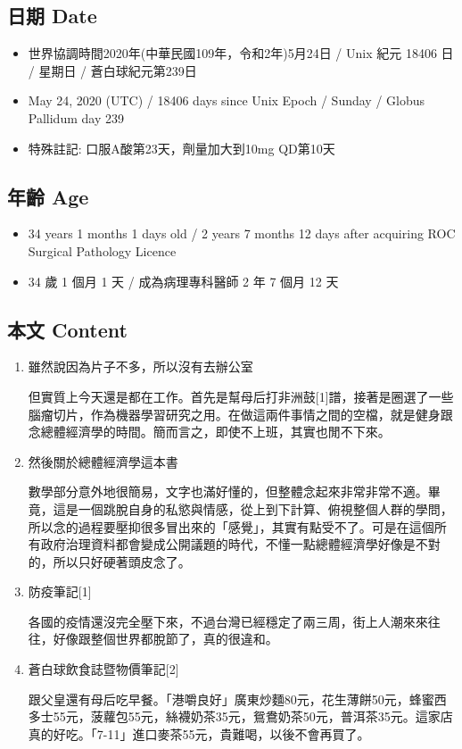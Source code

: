 \documentclass[a5paper, 12pt
]{book}
\providecommand{\tightlist}{%
  \setlength{\itemsep}{0pt}\setlength{\parskip}{0pt}}
\begin{document}
\hypertarget{ux65e5ux671f-date-84}{%
\subsection{日期 Date}\label{ux65e5ux671f-date-84}}

\begin{itemize}
\tightlist
\item
  世界協調時間2020年(中華民國109年，令和2年)5月24日 / Unix 紀元 18406 日
  / 星期日 / 蒼白球紀元第239日
\item
  May 24, 2020 (UTC) / 18406 days since Unix Epoch / Sunday / Globus
  Pallidum day 239
\item
  特殊註記: 口服A酸第23天，劑量加大到10mg QD第10天
\end{itemize}

\hypertarget{ux5e74ux9f61-age-84}{%
\subsection{年齡 Age}\label{ux5e74ux9f61-age-84}}

\begin{itemize}
\tightlist
\item
  34 years 1 months 1 days old / 2 years 7 months 12 days after
  acquiring ROC Surgical Pathology Licence
\item
  34 歲 1 個月 1 天 / 成為病理專科醫師 2 年 7 個月 12 天
\end{itemize}

\hypertarget{ux672cux6587-content-84}{%
\subsection{本文 Content}\label{ux672cux6587-content-84}}

\begin{enumerate}
\def\labelenumi{\arabic{enumi}.}
\item
  雖然說因為片子不多，所以沒有去辦公室

  但實質上今天還是都在工作。首先是幫母后打非洲鼓{[}1{]}譜，接著是圈選了一些腦瘤切片，作為機器學習研究之用。在做這兩件事情之間的空檔，就是健身跟念總體經濟學的時間。簡而言之，即使不上班，其實也閒不下來。
\item
  然後關於總體經濟學這本書

  數學部分意外地很簡易，文字也滿好懂的，但整體念起來非常非常不適。畢竟，這是一個跳脫自身的私慾與情感，從上到下計算、俯視整個人群的學問，所以念的過程要壓抑很多冒出來的「感覺」，其實有點受不了。可是在這個所有政府治理資料都會變成公開議題的時代，不懂一點總體經濟學好像是不對的，所以只好硬著頭皮念了。
\item
  防疫筆記{[}1{]}

  各國的疫情還沒完全壓下來，不過台灣已經穩定了兩三周，街上人潮來來往往，好像跟整個世界都脫節了，真的很違和。
\item
  蒼白球飲食誌暨物價筆記{[}2{]}

  跟父皇還有母后吃早餐。「港嚼良好」廣東炒麵80元，花生薄餅50元，蜂蜜西多士55元，菠蘿包55元，絲襪奶茶35元，鴛鴦奶茶50元，普洱茶35元。這家店真的好吃。「7-11」進口麥茶55元，貴難喝，以後不會再買了。
\end{enumerate}
\end{document}
